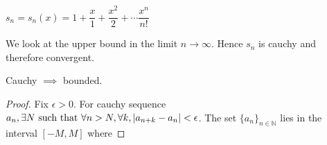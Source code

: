 \begin{example}
    $s_n=s_n(x)=1+\dfrac{x}{1}+\dfrac{x^2}{2}+\dotsb\dfrac{x^n}{n!}$
    
    We look at the upper bound in the limit $n\to\infty.$
    Hence $s_n$ is cauchy and therefore convergent.
\end{example}

\begin{theorem}
    Cauchy $\implies$ bounded.
\end{theorem}
\begin{proof}
    Fix $\epsilon>0$. For cauchy sequence $a_n,\exists N\text{ such that }\forall n>N,\forall k,\abs{a_{n+k}-a_n}<\epsilon$. The set $\{a_n\}_{n\in\mathbb{N}}$ lies in the interval $[-M,M]$ where
\end{proof}

